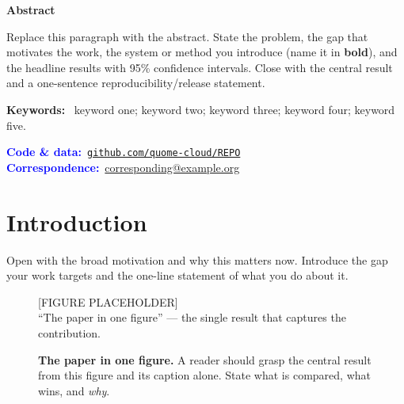 \documentclass[11pt]{article}
\let\oldincludegraphics\includegraphics
\renewcommand{\includegraphics}[2][]{%
  \setlength{\fboxsep}{0pt}\setlength{\fboxrule}{0.5pt}%
  \fbox{\oldincludegraphics[#1]{#2}}}
\newcommand{\todofig}[2]{%
  \begin{tcolorbox}[colback=black!4, colframe=black!35, arc=3pt, boxrule=0.5pt,
    halign=center, valign=center, height=#1, width=\linewidth]
    {\ttfamily\small [FIGURE PLACEHOLDER]\\[4pt] #2}
  \end{tcolorbox}}
\begin{document}
\vspace{0.5em}
\begin{tcolorbox}[breakable, enhanced jigsaw, colback=black!4, colframe=black!4,
  arc=5pt, boxrule=0pt, left=16pt, right=16pt, top=10pt, bottom=10pt]
\setlength{\parskip}{0pt}
{\centering\large\bfseries Abstract\par}
\smallskip
\fontsize{9.5}{11.3}\selectfont
Replace this paragraph with the abstract. State the problem, the gap that motivates
the work, the system or method you introduce (name it in \textbf{bold}), and the
headline results with 95\% confidence intervals. Close with the central result and a
one-sentence reproducibility/release statement.

\medskip
\noindent\textbf{Keywords:}~%
keyword one; keyword two; keyword three; keyword four; keyword five.

\medskip
\noindent\textcolor{blue}{\textbf{Code \& data:}}~\href{https://github.com/quome-cloud/REPO}{\texttt{github.com/quome-cloud/REPO}}\\
\noindent\textcolor{blue}{\textbf{Correspondence:}}~\href{mailto:corresponding@example.org}{corresponding@example.org}
\end{tcolorbox}

\vspace{2pt}
\vspace{0.3em}

\section{Introduction}
Open with the broad motivation and why this matters now. Introduce the gap your
work targets and the one-line statement of what you do about it.

\begin{figure}[htb]
\centering
\todofig{5cm}{``The paper in one figure'' — the single result that captures the contribution.}
\caption{\textbf{The paper in one figure.} A reader should grasp the central result
from this figure and its caption alone. State what is compared, what wins, and
\emph{why}.}
\label{fig:hero}
\end{figure}
\end{document}
